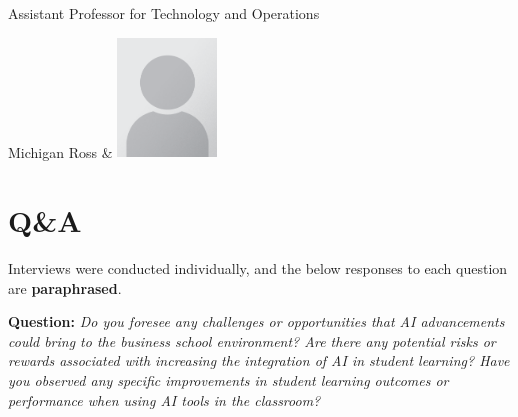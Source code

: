 \documentclass[
]{book}
\begin{document}
\begin{longtable}[]
Assistant Professor for Technology and Operations

Michigan Ross & \includegraphics[width=1.04167in,height=\textheight]{plc.png} \\
\end{longtable}

\hypertarget{qa}{%
\section{Q\&A}\label{qa}}

Interviews were conducted individually, and the below responses to each question are \textbf{paraphrased}.

\textbf{Question:} \emph{Do you foresee any challenges or opportunities that AI advancements could bring to the business school environment? Are there any potential risks or rewards associated with increasing the integration of AI in student learning? Have you observed any specific improvements in student learning outcomes or performance when using AI tools in the classroom?}
\end{document}
